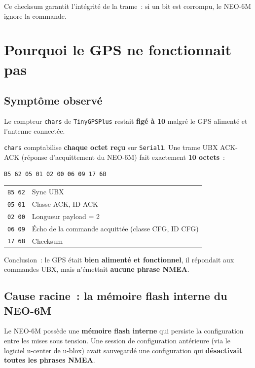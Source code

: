 \documentclass[12pt,a4paper]{article}
\newcommand{\code}[1]{\texttt{#1}}
\begin{document}
Ce checksum garantit l'int\'egrit\'e de la trame~: si un bit est corrompu,
le NEO-6M ignore la commande.

\section{Pourquoi le GPS ne fonctionnait pas}

\subsection{Sympt\^ome observ\'e}

Le compteur \code{chars} de \code{TinyGPSPlus} restait \textbf{fig\'e \`a 10}
malgr\'e le GPS aliment\'e et l'antenne connect\'ee.

\begin{alertbox}[title={Diagnostic~: que signifie chars = 10~?}]
\code{chars} comptabilise \textbf{chaque octet re\c{c}u} sur \code{Serial1}.
Une trame UBX ACK-ACK (r\'eponse d'acquittement du NEO-6M) fait exactement
\textbf{10 octets}~:

\medskip
\texttt{B5 62 05 01 02 00 06 09 17 6B}

\medskip
\begin{tabular}{ll}
\texttt{B5 62} & Sync UBX \\
\texttt{05 01} & Classe ACK, ID ACK \\
\texttt{02 00} & Longueur payload = 2 \\
\texttt{06 09} & \'Echo de la commande acquitt\'ee (classe CFG, ID CFG) \\
\texttt{17 6B} & Checksum \\
\end{tabular}

\medskip
Conclusion~: le GPS \'etait \textbf{bien aliment\'e et fonctionnel},
il r\'epondait aux commandes UBX, mais n'\'emettait \textbf{aucune phrase NMEA}.
\end{alertbox}

\subsection{Cause racine~: la m\'emoire flash interne du NEO-6M}

Le NEO-6M poss\`ede une \textbf{m\'emoire flash interne} qui persiste la
configuration entre les mises sous tension. Une session de configuration
ant\'erieure (via le logiciel u-center de u-blox) avait sauvegard\'e une
configuration qui \textbf{d\'esactivait toutes les phrases NMEA}.
\end{document}
